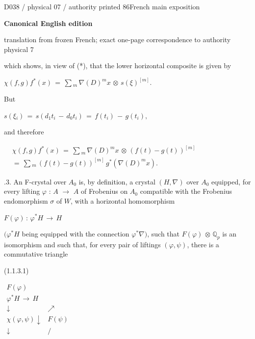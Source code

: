 \documentclass[9pt]{article}
\newcommand{\CanonText}[1]{\par{\fontsize{8.0}{9.35}\selectfont\RaggedRight #1\par}\vspace{2.2pt}}
\newcommand{\CanonDisplay}[1]{\par\vspace{1.2pt}\begin{center}{\fontsize{7.2}{8.4}\selectfont\(\displaystyle #1\)}\end{center}\vspace{1.2pt}}
\newenvironment{CanonMathBlock}{\par\vspace{1.2pt}\begin{center}\fontsize{6.8}{8.0}\selectfont\(\displaystyle}{\)\end{center}\vspace{1.2pt}}
\newcommand{\LayerTitle}{Canonical English edition}
\begin{document}
\noindent\begin{minipage}[t][\dimexpr\textheight-5pt\relax][t]{\textwidth}
{\sffamily\fontsize{7.3}{8.2}\selectfont\color{Quiet} D038 / physical 07 / authority printed 86\hfill French main exposition}
\par{}\vspace{4.5pt}
{\sffamily\fontsize{10.4}{11.6}\selectfont\bfseries\color{Accent} \LayerTitle}
\par{\sffamily\fontsize{6.7}{7.7}\selectfont\color{Quiet} translation from frozen French; exact one-page correspondence to authority physical 7}
\vspace{5pt}
\CanonText{which shows, in view of (*), that the lower horizontal composite is given by}
\CanonDisplay{\chi{}(f,g)f^{*}(x)\,=\,\sum{}_{m}\,\nabla{}(D)^{m}x\,\otimes{}\,s(\xi{})^{[m]}.}
\CanonText{But}
\CanonDisplay{s(\xi{}_{i})\,=\,s(d_{1}t_{i}\,-\,d_{0}t_{i})\,=\,f(t_{i})\,-\,g(t_{i}),}
\CanonText{and therefore}
\begin{CanonMathBlock}
\begin{aligned}
& \chi{}(f,g)f^{*}(x)\,=\,\sum{}_{m}\,\nabla{}(D)^{m}x\,\otimes{}\,(f(t)-g(t))^{[m]}\\
& =\,\sum{}_{m}\,(f(t)-g(t))^{[m]}\,g^{*}(\nabla{}(D)^{m}x).
\end{aligned}
\end{CanonMathBlock}
\CanonText{1.1.3. An F-crystal over \(A_{0}\) is, by definition, a crystal \((H,\nabla{})\) over \(A_{0}\) equipped, for every lifting \(\varphi{}\) : \(A\) \(\to{}\) \(A\) of Frobenius on \(A_{0}\) compatible with the Frobenius endomorphism \(\sigma{}\) of \(W\), with a horizontal homomorphism}
\CanonDisplay{F(\varphi{})\,:\,\varphi{}^{*}H\,\to{}\,H}
\CanonText{\((\varphi{}^{*}H\) being equipped with the connection \(\varphi{}^{*}\nabla{})\), such that \(F(\varphi{})\) \(\otimes{}\) \(\mathbb{Q}_{p}\) is an isomorphism and such that, for every pair of liftings \((\varphi{},\psi{})\), there is a commutative triangle}
\CanonText{(1.1.3.1)}
\begin{CanonMathBlock}
\begin{array}{cc}
F(\varphi{}) & {}\\
\varphi{}^{*}H\,\longrightarrow{}\,H & {}\\
\downarrow{} & \nearrow{}\\
\chi{}(\varphi{},\psi{})\downarrow{} & F(\psi{})\\
\downarrow{} & /\\

\end{array}
\end{CanonMathBlock}
\end{minipage}
\end{document}
